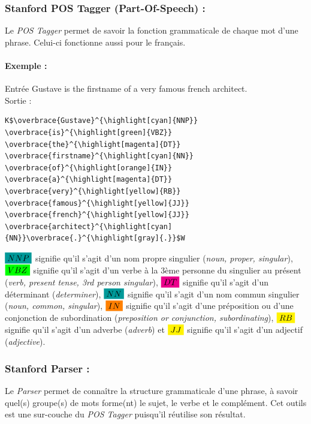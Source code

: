             \subsubsection{Stanford POS Tagger (Part-Of-Speech) :}
                Le \textit{POS Tagger} permet de savoir la fonction grammaticale de chaque mot d'une phrase. Celui-ci fonctionne aussi pour le français.

                \paragraph{Exemple :}
                    Entrée \og Gustave is the firstname of a very famous french architect.\fg\\
                    Sortie :
\begin{lstlisting}
K$\overbrace{Gustave}^{\highlight[cyan]{NNP}} \overbrace{is}^{\highlight[green]{VBZ}} \overbrace{the}^{\highlight[magenta]{DT}} \overbrace{firstname}^{\highlight[cyan]{NN}} \overbrace{of}^{\highlight[orange]{IN}} \overbrace{a}^{\highlight[magenta]{DT}} \overbrace{very}^{\highlight[yellow]{RB}} \overbrace{famous}^{\highlight[yellow]{JJ}} \overbrace{french}^{\highlight[yellow]{JJ}} \overbrace{architect}^{\highlight[cyan]{NN}}\overbrace{.}^{\highlight[gray]{.}}$W
\end{lstlisting}
                \textit{$\highlight[cyan]{NNP}$} signifie qu'il s'agit d'un nom propre singulier (\textit{noun, proper, singular}), \textit{$\highlight[green]{VBZ}$} signifie qu'il s'agit d'un verbe à la 3ème personne du singulier au présent (\textit{verb, present tense, 3rd person singular}), \textit{$\highlight[magenta]{DT}$} signifie qu'il s'agit d'un déterminant (\textit{determiner}), \textit{$\highlight[cyan]{NN}$} signifie qu'il s'agit d'un nom commun singulier (\textit{noun, common, singular}), \textit{$\highlight[orange]{IN}$} signifie qu'il s'agit d'une préposition ou d'une conjonction de subordination (\textit{preposition or conjunction, subordinating}), \textit{$\highlight[yellow]{RB}$} signifie qu'il s'agit d'un adverbe (\textit{adverb}) et \textit{$\highlight[yellow]{JJ}$} signifie qu'il s'agit d'un adjectif (\textit{adjective}).

            \subsubsection{Stanford Parser :}
                Le \textit{Parser} permet de connaître la structure grammaticale d'une phrase, à savoir quel(s) groupe(s) de mots forme(nt) le sujet, le verbe et le complément. Cet outils est une sur-couche du \textit{POS Tagger} puisqu'il réutilise son résultat.

